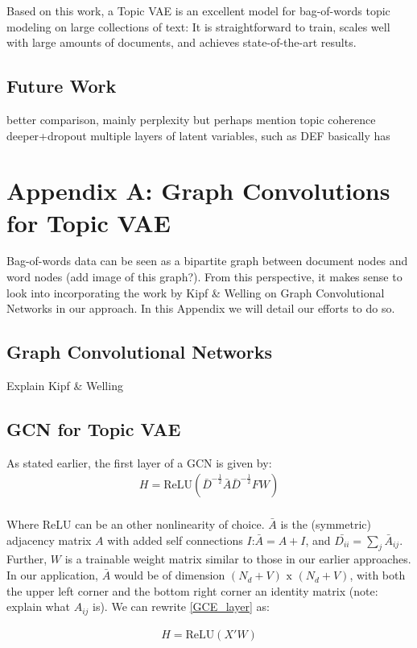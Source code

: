 \documentclass{report}
\begin{document}
Based on this work, a Topic VAE is an excellent model for bag-of-words topic modeling on large collections of text: It is straightforward to train, scales well with large amounts of documents, and achieves state-of-the-art results. 

\section{Future Work}
better comparison, mainly perplexity but perhaps mention topic coherence
deeper+dropout
multiple layers of latent variables, such as DEF basically has



	\chapter{Appendix A: Graph Convolutions for Topic VAE}
	
	Bag-of-words data can be seen as a bipartite graph between document nodes and word nodes (add image of this graph?). From this perspective, it makes sense to look into incorporating the work by Kipf \& Welling on Graph Convolutional Networks in our approach. In this Appendix we will detail our efforts to do so. \\
	\section{Graph Convolutional Networks}
	Explain Kipf \& Welling 
	\section{GCN for Topic VAE}	
	As stated earlier, the first layer of a GCN is given by:
	\begin{align}\label{GCE_layer}
	H = \text{ReLU}(\bar{D}^{-\frac{1}{2}}\bar{A}\bar{D}^{-\frac{1}{2}}FW)
	\end{align}
	\\
	Where ReLU can be an other nonlinearity of choice. $\bar{A}$ is the (symmetric) adjacency matrix $A$ with added self connections $I$:$\bar{A} = A+I$, and $\bar{D_{ii}}=\sum_j\bar{A}_{ij}$. Further, $W$ is a trainable weight matrix similar to those in our earlier approaches. In our application, $\bar{A}$ would be of dimension $(N_d + V) \text{ x } (N_d + V)$, with both the upper left corner and the bottom right corner an identity matrix (note: explain what $A_{ij}$ is). We can rewrite \ref{GCE_layer} as:
	
	\begin{align}
	H = \text{ReLU}(X'W)
	\end{align}
	
\end{document}
